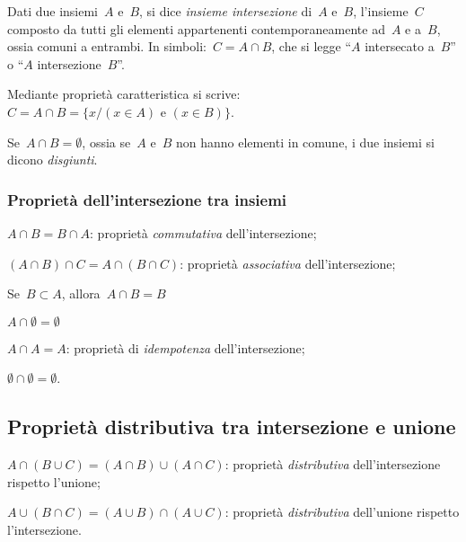 \begin{definizione}
Dati due insiemi~\(A\) e~\(B\), si dice \emph{insieme intersezione} 
di~\(A\) e~\(B\), 
l'insieme~\(C\) composto da tutti gli elementi appartenenti 
contemporaneamente 
ad~\(A\) e a~\(B\), ossia comuni a entrambi.
In simboli:~\(C=A\cap B\), che si legge ``\(A\) intersecato a~\(B\)'' 
o ``\(A\) intersezione~\(B\)''.
\end{definizione}
\begin{center}
 
\end{center}
Mediante proprietà caratteristica si 
scrive:~\(C=A\cap B=\{x/(x\in A)\text{ e }(x\in B)\}\).

Se~\(A\cap B=\emptyset \), ossia se~\(A\) e~\(B\) non hanno
elementi in comune, i due insiemi si dicono \emph{disgiunti}.

\subsubsection{Proprietà dell'intersezione tra insiemi}

\begin{enumeratea}
\item \(A\cap B=B\cap A\): proprietà \emph{commutativa} dell'intersezione;
\item \((A\cap B)\cap C=A\cap (B\cap C)\): proprietà \emph{associativa} 
dell'intersezione;
\item Se~\(B\subset A\), allora~\(A\cap B=B\)
\item \(A\cap \emptyset =\emptyset\)
\item \(A\cap A=A\): proprietà di \emph{idempotenza} dell'intersezione;
\item \(\emptyset \cap \emptyset =\emptyset\).
\end{enumeratea}

\subsection[Proprietà distributiva]
{Proprietà distributiva tra intersezione e unione}

\begin{enumeratea}
\item \(A\cap (B\cup C)=(A\cap B)\cup (A\cap C)\): 
proprietà \emph{distributiva} dell'intersezione rispetto l'unione;
\item \(A\cup (B\cap C)=(A\cup B)\cap (A\cup C)\): 
proprietà \emph{distributiva} dell'unione rispetto l'intersezione.
\end{enumeratea}

